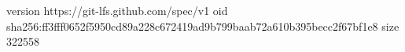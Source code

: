 version https://git-lfs.github.com/spec/v1
oid sha256:ff3fff0652f5950cd89a228c672419ad9b799baab72a610b395becc2f67bf1e8
size 322558
